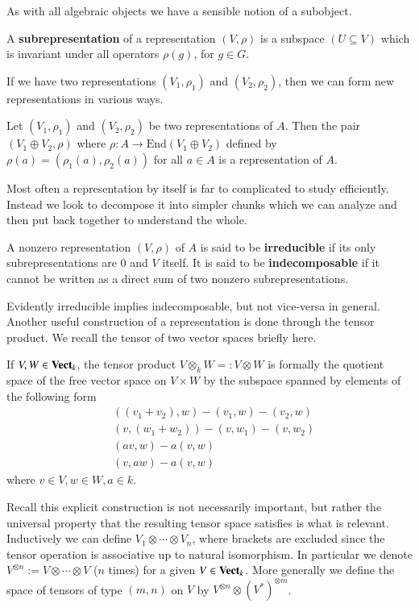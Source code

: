 As with all algebraic objects we have a sensible notion of a subobject.

\begin{definition}
    A \textbf{subrepresentation} of a representation $(V,\rho)$ is a subspace $(U\subseteq V)$ which is invariant under all operators $\rho(g)$, for $g \in G$.
\end{definition}

If we have two representations $(V_1,\rho_1)$ and $(V_2,\rho_2)$, then we can form new representations in various ways.

\begin{definition}
    Let $(V_1,\rho_1)$ and $(V_2,\rho_2)$ be two representations of $A$. Then the pair $(V_1\oplus V_2,\rho)$ where $\rho:A\rightarrow \text{End}(V_1\oplus V_2)$ defined by $\rho(a) = (\rho_1(a),\rho_2(a))$ for all $a \in A$ is a representation of $A$.
\end{definition}

Most often a representation by itself is far to complicated to study efficiently. Instead we look to decompose it into simpler chunks which we can analyze and then put back together to understand the whole.

\begin{definition}
    A nonzero representation $(V,\rho)$ of $A$ is said to be \textbf{irreducible} if its only subrepresentations are $0$ and $V$ itself. It is said to be \textbf{indecomposable} if it cannot be written as a direct sum of two nonzero subrepresentations.
\end{definition}

Evidently irreducible implies indecomposable, but not vice-versa in general. Another useful construction of a representation is done through the tensor product. We recall the tensor of two vector spaces briefly here.

\begin{definition}
    If $V,W \in \normalfont\textbf{Vect}_{k}$, the tensor product $V\otimes_kW =: V\otimes W$ is formally the quotient space of the free vector space on $V\times W$ by the subspace spanned by elements of the following form \begin{align*}
        &((v_1+v_2),w)-(v_1,w)-(v_2,w) \\
        &(v,(w_1+w_2)) - (v,w_1) - (v,w_2) \\
        &(av,w) - a(v,w) \\
        &(v,aw) - a(v,w)
    \end{align*}
    where $v \in V,w \in W, a \in k$.
\end{definition}
Recall this explicit construction is not necessarily important, but rather the universal property that the resulting tensor space satisfies is what is relevant. Inductively we can define $V_1\otimes \cdots \otimes V_n$, where brackets are excluded since the tensor operation is associative up to natural isomorphism. In particular we denote $V^{\otimes n} := V\otimes \cdots \otimes V$ ($n$ times) for a given $V \in \normalfont\textbf{Vect}_{k}$. More generally we define the space of tensors of type $(m,n)$ on $V$ by $V^{\otimes n}\otimes (V^*)^{\otimes m}$. 

